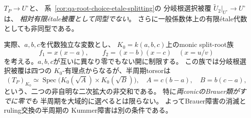 \begin{theorem}[分岐根選択と半周期の二つの四重被覆は異なる]
\label{thm:qa-half-period-not-root-choice}
$T_P\to U^\circ$と、
系~\ref{cor:qa-root-choice-etale-splitting}の
分岐根選択被覆
$\widetilde U_2|_{U^\circ}\to U^\circ$は、
\emph{相対有限\'{e}tale被覆として同型でない}。
さらに一般係数体上の有限\'{e}tale代数としても非同型である。

実際、$a,b,c$を代数独立な変数とし、
$K_0=k(a,b,c)$上のmonic split-root族
\[
 f_1=x(x-a),\qquad f_2=(x-b)(x-c)
 \quad(x=u/v)
\]
を考える。$a,b,c$が互いに異なり零でもない開に制限する。
この族では分岐根選択被覆は四つの
$K_0$-有理点からなるが、半周期torsorは
\begin{equation}
 (T_P)_{K_0}\simeq
 \operatorname{Spec}\bigl(K_0(\sqrt A)\times K_0(\sqrt B)\bigr),
 \quad
 A=c(b-a),\quad B=b(c-a),
 \label{eq:qa-half-period-split-roots-quadratics}
\end{equation}
という、二つの非自明な二次拡大の非交和である。
特に\emph{両conicのBrauer類がすでに零でも}
半周期を大域的に選べるとは限らない。
よってBrauer障害の消滅とruling交換の半周期の
Kummer障害は別の条件である。
\end{theorem}
